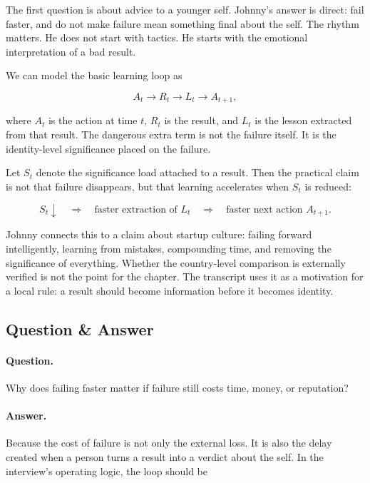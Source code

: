 The first question is about advice to a younger self. Johnny's answer is direct: fail faster, and do not make failure mean something final about the self. The rhythm matters. He does not start with tactics. He starts with the emotional interpretation of a bad result.

We can model the basic learning loop as

\begin{equation}
A_t \longrightarrow R_t \longrightarrow L_t \longrightarrow A_{t+1},
\end{equation}

where \(A_t\) is the action at time \(t\), \(R_t\) is the result, and \(L_t\) is the lesson extracted from that result. The dangerous extra term is not the failure itself. It is the identity-level significance placed on the failure.

Let \(S_t\) denote the significance load attached to a result. Then the practical claim is not that failure disappears, but that learning accelerates when \(S_t\) is reduced:

\begin{equation}
S_t \downarrow
\quad \Longrightarrow \quad
\text{faster extraction of } L_t
\quad \Longrightarrow \quad
\text{faster next action } A_{t+1}.
\end{equation}

Johnny connects this to a claim about startup culture: failing forward intelligently, learning from mistakes, compounding time, and removing the significance of everything. Whether the country-level comparison is externally verified is not the point for the chapter. The transcript uses it as a motivation for a local rule: a result should become information before it becomes identity.

\subsection{Question \& Answer}

\paragraph{Question.}
Why does failing faster matter if failure still costs time, money, or reputation?

\paragraph{Answer.}
Because the cost of failure is not only the external loss. It is also the delay created when a person turns a result into a verdict about the self. In the interview's operating logic, the loop should be

